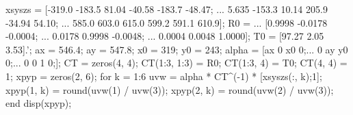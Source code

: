 \documentclass[]{article}
\newenvironment{Shaded}{}{}
\newcommand{\FloatTok}[1]{\textcolor[rgb]{0.25,0.63,0.44}{#1}}
\newcommand{\NormalTok}[1]{#1}
\begin{document}
\begin{enumerate}
\begin{Shaded}
\begin{Highlighting}[]
\NormalTok{xsyszs = [-}\FloatTok{319.0}\NormalTok{ -}\FloatTok{183.5}   \FloatTok{81.04}\NormalTok{  -}\FloatTok{40.58}\NormalTok{ -}\FloatTok{183.7}\NormalTok{  -}\FloatTok{48.47}\NormalTok{; ...}
   \FloatTok{5.635}\NormalTok{ -}\FloatTok{153.3}   \FloatTok{10.14}  \FloatTok{205.9}\NormalTok{  -}\FloatTok{34.94}   \FloatTok{54.10}\NormalTok{; ...}
   \FloatTok{585.0}  \FloatTok{603.0}   \FloatTok{615.0}  \FloatTok{599.2}  \FloatTok{591.1}    \FloatTok{610.9}\NormalTok{];}
\NormalTok{R0 = ...}
\NormalTok{   [}\FloatTok{0.9998}\NormalTok{   -}\FloatTok{0.0178}\NormalTok{   -}\FloatTok{0.0004}\NormalTok{; ...}
    \FloatTok{0.0178}    \FloatTok{0.9998}\NormalTok{   -}\FloatTok{0.0048}\NormalTok{; ...}
    \FloatTok{0.0004}    \FloatTok{0.0048}    \FloatTok{1.0000}\NormalTok{];}
\NormalTok{T0 = [}\FloatTok{97.27} \FloatTok{2.05} \FloatTok{3.53}\NormalTok{].';}
\NormalTok{ax = }\FloatTok{546.4}\NormalTok{;}
\NormalTok{ay = }\FloatTok{547.8}\NormalTok{;}
\NormalTok{x0 = }\FloatTok{319}\NormalTok{;}
\NormalTok{y0 = }\FloatTok{243}\NormalTok{;}
\NormalTok{alpha = [ax }\FloatTok{0}\NormalTok{  x0 }\FloatTok{0}\NormalTok{;...}
         \FloatTok{0}\NormalTok{  ay y0 }\FloatTok{0}\NormalTok{;...}
         \FloatTok{0}  \FloatTok{0}  \FloatTok{1}  \FloatTok{0}\NormalTok{;];}
\NormalTok{CT = zeros(}\FloatTok{4}\NormalTok{, }\FloatTok{4}\NormalTok{);}
\NormalTok{CT(}\FloatTok{1}\NormalTok{:}\FloatTok{3}\NormalTok{, }\FloatTok{1}\NormalTok{:}\FloatTok{3}\NormalTok{) = R0;}
\NormalTok{CT(}\FloatTok{1}\NormalTok{:}\FloatTok{3}\NormalTok{, }\FloatTok{4}\NormalTok{) = T0;}
\NormalTok{CT(}\FloatTok{4}\NormalTok{, }\FloatTok{4}\NormalTok{) = }\FloatTok{1}\NormalTok{;}
\NormalTok{xpyp = zeros(}\FloatTok{2}\NormalTok{, }\FloatTok{6}\NormalTok{);}
\NormalTok{for k = }\FloatTok{1}\NormalTok{:}\FloatTok{6}
\NormalTok{    uvw = alpha * CT^(-}\FloatTok{1}\NormalTok{) * [xsyszs(:, k);}\FloatTok{1}\NormalTok{];}
\NormalTok{    xpyp(}\FloatTok{1}\NormalTok{, k) = round(uvw(}\FloatTok{1}\NormalTok{) / uvw(}\FloatTok{3}\NormalTok{));}
\NormalTok{    xpyp(}\FloatTok{2}\NormalTok{, k) = round(uvw(}\FloatTok{2}\NormalTok{) / uvw(}\FloatTok{3}\NormalTok{));}
\NormalTok{end}
\NormalTok{disp(xpyp);}
\end{Highlighting}
\end{Shaded}

\end{enumerate}
\end{document}
